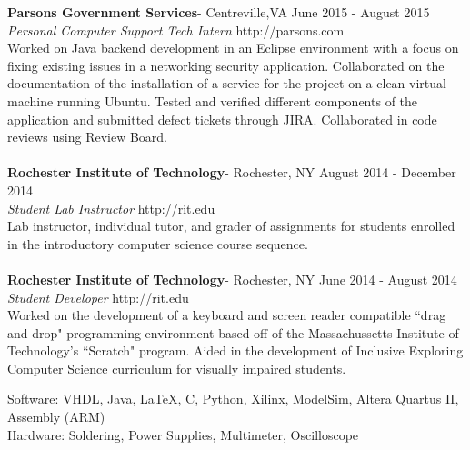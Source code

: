 \documentclass[9pt]{article} %
\begin{document}
{
\newline
	\textbf{Parsons Government Services}- Centreville,VA			\hfill June 2015 - August 2015
	\\ \textit{Personal Computer Support Tech Intern}	\hfill http://parsons.com
	\\ \indent Worked on Java backend development in an Eclipse environment with a focus on fixing existing issues in a networking security application.  Collaborated on the documentation of the installation of a service for the project on a clean virtual machine running Ubuntu.  Tested and verified different components of the application and submitted defect tickets through JIRA.  Collaborated in code reviews using Review Board.
	\\    
	\\	
	\textbf{Rochester Institute of Technology}- Rochester, NY 		\hfill August 2014 - December 2014
	\\ \textit{Student Lab Instructor}								\hfill http://rit.edu
	\\ \indent Lab instructor, individual tutor, and grader of assignments for students enrolled in the introductory computer science course sequence.   
	\\	
	\\ \textbf{Rochester Institute of Technology}- Rochester, NY 	\hfill June 2014 - August 2014
	\\ \textit{Student Developer}									\hfill http://rit.edu
	\\ \indent Worked on the development of a keyboard and screen reader compatible ``drag and drop" programming environment based off of the Massachussetts Institute of Technology's ``Scratch" program.  Aided in the development of Inclusive Exploring Computer Science curriculum for visually impaired students.


\bigskip


\newline
	Software: VHDL, Java, \LaTeX, C, Python, Xilinx, ModelSim, Altera Quartus II, Assembly (ARM)\\
	Hardware: Soldering, Power Supplies, Multimeter, Oscilloscope

}
\end{document}
